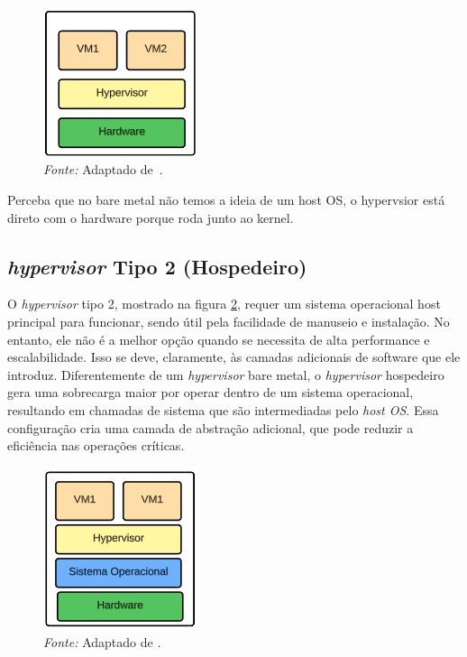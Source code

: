 \begin{figure}[h!]
  \centering
  \caption{\textit{Hypervisor} do tipo 1. A imagem ilustra a operação direta com o hardware, onde não há camadas intermediárias entre o \textit{hypervisor} e o \textit{hardware}, aumentando a performance.}
  \includegraphics[width=0.4\textwidth]{images/hypervisor_type_1.png}
  \caption*{\textit{Fonte:} Adaptado de~\citep{chirammal2016mastering}.}
  \label{fig:hypervisor_type01}
\end{figure}


Perceba que no bare metal não temos a ideia de um host OS, o hypervsior está direto com o hardware porque roda junto ao kernel.


\subsection*{\textit{hypervisor} Tipo 2 (Hospedeiro)}

O \textit{hypervisor} tipo 2, mostrado na figura \ref{fig:hypervisor_type02}, requer um sistema operacional host principal para funcionar, sendo útil pela facilidade de manuseio e instalação. No entanto, ele não é a melhor opção quando se necessita de alta performance e escalabilidade. Isso se deve, claramente, às camadas adicionais de software que ele introduz. Diferentemente de um \textit{hypervisor} bare metal, o \textit{hypervisor} hospedeiro gera uma sobrecarga maior por operar dentro de um sistema operacional, resultando em chamadas de sistema que são intermediadas pelo \textit{host OS}. Essa configuração cria uma camada de abstração adicional, que pode reduzir a eficiência nas operações críticas.


\begin{figure}[htbp]
  \centering
  \caption{\textit{hypervisor} do tipo 2. A imagem mostra a necessidade de um sistema operacional hospedeiro para o funcionamento do \textit{hypervisor}.}
  \includegraphics[width=0.4\textwidth]{images/hypervisor_type_2.png}
  \caption*{\textit{Fonte:} Adaptado de \citep{chirammal2016mastering}.}
  \label{fig:hypervisor_type02}
\end{figure}


